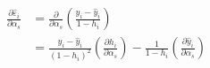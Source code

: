\documentclass[10pt]{article}
\begin{document}
\begin{align*}\begin{split}
\frac{\partial \hat{\varepsilon}_i}{\partial \alpha_s} &=
\frac{\partial}{\partial \alpha_s} \left(\frac{y_i - \hat{y}_i}{1 - h_i}\right) \\
&= \frac{y_i - \hat{y}_i}{\left(1 - h_i\right)^2}\left(\frac{\partial h_i}{\partial \alpha_s}\right) -
\frac{1}{1 - h_i}\left(\frac{\partial \hat{y}_i}{\partial \alpha_s}\right) \\
\end{split}\end{align*}
\end{document}
